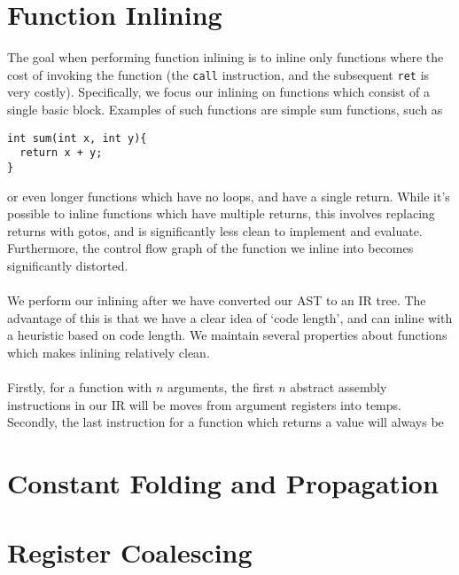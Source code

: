 \documentclass[11pt]{article}
\begin{document}
\section{Function Inlining}
The goal when performing function inlining is to inline only functions where the cost of 
invoking the function (the \verb+call+ instruction, and the subsequent \verb+ret+ is very 
costly). Specifically, we focus our inlining on functions which consist of a single basic 
block. Examples of such functions are simple sum functions, such as 
\begin{verbatim}
int sum(int x, int y){
  return x + y;
}
\end{verbatim}
or even longer functions which have no loops, and have a single return. While it's possible to inline
functions which have multiple returns, this involves replacing returns with gotos, and is 
significantly less clean to implement and evaluate. Furthermore, the control flow graph of 
the function we inline into becomes significantly distorted. \\
\\
We perform our inlining after we have converted our AST to an IR tree. The advantage of this is that
we have a clear idea of `code length', and can inline with a heuristic based on code length. We maintain
several properties about functions which makes inlining relatively clean. \\
\\
Firstly, for a function with $n$ arguments, the first $n$ abstract assembly instructions in our IR will 
be moves from argument registers into temps. Secondly, the last instruction for a function which returns a 
value will always be 

\section{Constant Folding and Propagation}

\section{Register Coalescing}
\end{document}
